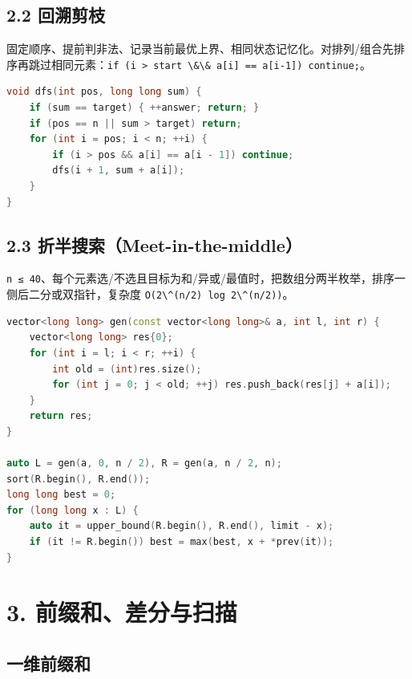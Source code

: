 \subsection{2.2 回溯剪枝}\label{ux56deux6eafux526aux679d}

固定顺序、提前判非法、记录当前最优上界、相同状态记忆化。对排列/组合先排序再跳过相同元素：\passthrough{\lstinline!if (i > start \&\& a[i] == a[i-1]) continue;!}。

\begin{lstlisting}[language={C++}]
void dfs(int pos, long long sum) {
    if (sum == target) { ++answer; return; }
    if (pos == n || sum > target) return;
    for (int i = pos; i < n; ++i) {
        if (i > pos && a[i] == a[i - 1]) continue;
        dfs(i + 1, sum + a[i]);
    }
}
\end{lstlisting}

\subsection{2.3 折半搜索（Meet-in-the-middle）}\label{ux6298ux534aux641cux7d22meet-in-the-middle}

\passthrough{\lstinline!n ≤ 40!}、每个元素选/不选且目标为和/异或/最值时，把数组分两半枚举，排序一侧后二分或双指针，复杂度 \passthrough{\lstinline!O(2\^(n/2) log 2\^(n/2))!}。

\begin{lstlisting}[language={C++}]
vector<long long> gen(const vector<long long>& a, int l, int r) {
    vector<long long> res{0};
    for (int i = l; i < r; ++i) {
        int old = (int)res.size();
        for (int j = 0; j < old; ++j) res.push_back(res[j] + a[i]);
    }
    return res;
}

auto L = gen(a, 0, n / 2), R = gen(a, n / 2, n);
sort(R.begin(), R.end());
long long best = 0;
for (long long x : L) {
    auto it = upper_bound(R.begin(), R.end(), limit - x);
    if (it != R.begin()) best = max(best, x + *prev(it));
}
\end{lstlisting}

\section{3. 前缀和、差分与扫描}\label{ux524dux7f00ux548cux5deeux5206ux4e0eux626bux63cf}

\subsection{一维前缀和}\label{ux4e00ux7ef4ux524dux7f00ux548c}

